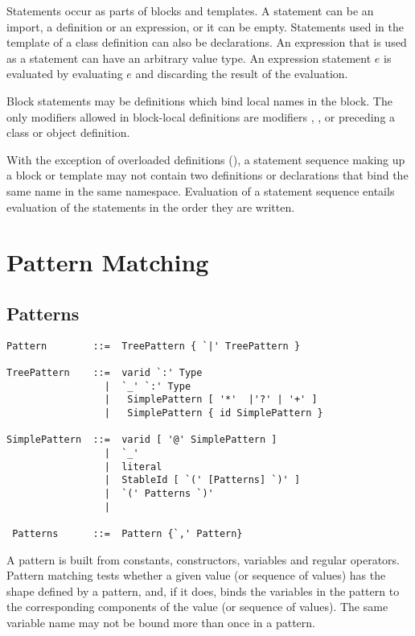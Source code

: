 \documentclass[a4paper,12pt,twoside,titlepage]{book}
\begin{document}
Statements occur as parts of blocks and templates.  A statement can be
an import, a definition or an expression, or it can be empty.
Statements used in the template of a class definition can also be
declarations.  An expression that is used as a statement can have an
arbitrary value type. An expression statement $e$ is evaluated by
evaluating $e$ and discarding the result of the evaluation. 

Block statements may be definitions which bind local names in the
block. The only modifiers allowed in block-local definitions are modifiers
, , or  preceding a class or
object definition.

With the exception of overloaded definitions
(), a statement sequence making up a block
or template may not contain two definitions or declarations that bind
the same name in the same namespace.  Evaluation of a statement
sequence entails evaluation of the statements in the order they are
written.

\chapter{Pattern Matching}

\section{Patterns}


\label{sec:patterns}

\syntax\begin{lstlisting}
Pattern        ::=  TreePattern { `|' TreePattern }

TreePattern    ::=  varid `:' Type
                 |  `_' `:' Type
                 |   SimplePattern [ '*'  |'?' | '+' ]
                 |   SimplePattern { id SimplePattern }

SimplePattern  ::=  varid [ '@' SimplePattern ]
                 |  `_'
                 |  literal
                 |  StableId [ `(' [Patterns] `)' ]
                 |  `(' Patterns `)'
                 |   

 Patterns      ::=  Pattern {`,' Pattern}
\end{lstlisting}

A pattern is built from constants, constructors, variables and regular
operators. Pattern matching tests whether a given value (or sequence
of values) has the shape defined by a pattern, and, if it does, binds
the variables in the pattern to the corresponding components of the
value (or sequence of values).  The same variable name may not be
bound more than once in a pattern.
\end{document}

